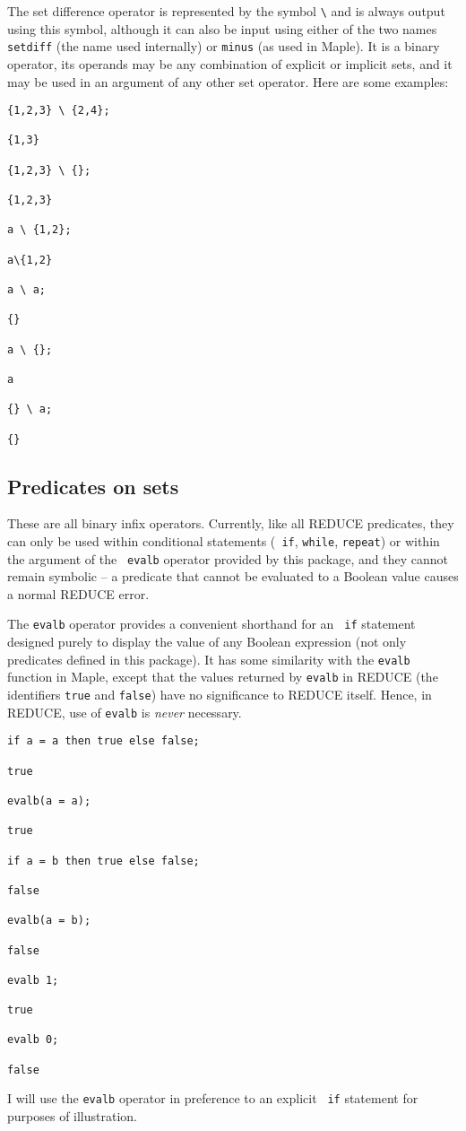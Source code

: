 The set difference operator is represented by the symbol \verb|\| and
is always output using this symbol, although it can also be input using
either of the two names {\tt setdiff} (the name used internally) or
{\tt minus} (as used in Maple).  It is a binary operator, its operands
may be any combination of explicit or implicit sets, and it may be
used in an argument of any other set operator.  Here are some
examples:
\begin{verbatim}
{1,2,3} \ {2,4};

{1,3}

{1,2,3} \ {};

{1,2,3}

a \ {1,2};

a\{1,2}

a \ a;

{}

a \ {};

a

{} \ a;

{}
\end{verbatim}


\subsection{Predicates on sets}

These are all binary infix operators.  Currently, like all REDUCE
predicates, they can only be used within conditional statements ({\tt
if}, {\tt while}, {\tt repeat}) or within the argument of the {\tt
evalb} operator provided by this package, and they cannot remain
symbolic -- a predicate that cannot be evaluated to a Boolean value
causes a normal REDUCE error.

The {\tt evalb} operator provides a convenient shorthand for an {\tt
if} statement designed purely to display the value of any Boolean
expression (not only predicates defined in this package).  It has some
similarity with the {\tt evalb} function in Maple, except that the
values returned by {\tt evalb} in REDUCE (the identifiers {\tt true}
and {\tt false}) have no significance to REDUCE itself.  Hence, in
REDUCE, use of {\tt evalb} is {\em never\/} necessary.
\begin{verbatim}
if a = a then true else false;

true

evalb(a = a);

true

if a = b then true else false;

false

evalb(a = b);

false

evalb 1;

true

evalb 0;

false
\end{verbatim}
I will use the {\tt evalb} operator in preference to an explicit {\tt
if} statement for purposes of illustration.


